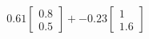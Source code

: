 \documentclass[preview]{standalone}
\begin{document}
\begin{align*}
0.61 \begin{bmatrix} 0.8 \\ 0.5 \end{bmatrix} + -0.23 \begin{bmatrix} 1 \\ 1.6 \end{bmatrix}
\end{align*}
\end{document}
